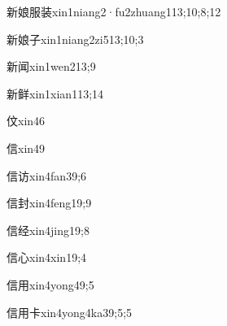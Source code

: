 \begin{verbete}{新娘服装}{xin1niang2·fu2zhuang1}{13;10;8;12}
\end{verbete}

\begin{verbete}{新娘子}{xin1niang2zi5}{13;10;3}
\end{verbete}

\begin{verbete}{新闻}{xin1wen2}{13;9}
\end{verbete}

\begin{verbete}{新鲜}{xin1xian1}{13;14}
\end{verbete}

\begin{verbete}{伩}{xin4}{6}
\end{verbete}

\begin{verbete}{信}{xin4}{9}
\end{verbete}

\begin{verbete}{信访}{xin4fan3}{9;6}
\end{verbete}

\begin{verbete}{信封}{xin4feng1}{9;9}
\end{verbete}

\begin{verbete}{信经}{xin4jing1}{9;8}
\end{verbete}

\begin{verbete}{信心}{xin4xin1}{9;4}
\end{verbete}

\begin{verbete}{信用}{xin4yong4}{9;5}
\end{verbete}

\begin{verbete}{信用卡}{xin4yong4ka3}{9;5;5}
\end{verbete}

